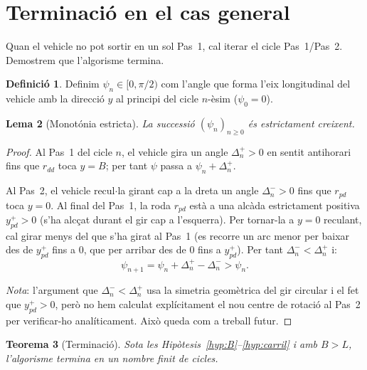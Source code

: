 \documentclass[11pt, a4paper]{article}
\theoremstyle{plain}
\newtheorem{theorem}{Teorema}[section]
\newtheorem{lemma}[theorem]{Lema}
\theoremstyle{definition}
\newtheorem{definition}[theorem]{Definici\'o}
\begin{document}
\section{Terminaci\'o en el cas general}\label{sec:terminacio}

Quan el vehicle no pot sortir en un sol Pas~1, cal iterar el cicle
Pas~1/Pas~2. Demostrem que l'algorisme termina.

\begin{definition}\label{def:psi}
Definim $\psi_n\in[0,\pi/2)$ com l'angle que forma l'eix longitudinal del
vehicle amb la direcci\'o $y$ al principi del cicle $n$-\`esim ($\psi_0=0$).
\end{definition}

\begin{lemma}[Monot\'onia estricta]\label{lem:mono}
La successi\'o $(\psi_n)_{n\geq 0}$ \'es estrictament creixent.
\end{lemma}

\begin{proof}
Al Pas~1 del cicle $n$, el vehicle gira un angle $\Delta_n^+>0$ en sentit
antihorari fins que $r_{dd}$ toca $y=B$; per tant $\psi$ passa a
$\psi_n+\Delta_n^+$.

Al Pas~2, el vehicle recul$\cdot$la girant cap a la dreta un angle
$\Delta_n^->0$ fins que $r_{pd}$ toca $y=0$. Al final del Pas~1, la roda
$r_{pd}$ est\`a a una alc\`ada estrictament positiva $y_{pd}^+>0$ (s'ha
alc\c{c}at durant el gir cap a l'esquerra). Per tornar-la a $y=0$ reculant,
cal girar menys del que s'ha girat al Pas~1 (es recorre un arc menor per
baixar des de $y_{pd}^+$ fins a $0$, que per arribar des de $0$ fins a
$y_{pd}^+$). Per tant $\Delta_n^-<\Delta_n^+$ i:
\[
  \psi_{n+1} = \psi_n+\Delta_n^+-\Delta_n^- > \psi_n.
\]

\textit{Nota}: l'argument que $\Delta_n^-<\Delta_n^+$ usa la simetria
geom\`etrica del gir circular i el fet que $y_{pd}^+>0$, per\`o no hem
calculat expl\'icitament el nou centre de rotaci\'o al Pas~2 per verificar-ho
anal\'iticament. Aix\`o queda com a treball futur.
\end{proof}

\begin{theorem}[Terminaci\'o]\label{thm:terminacio}
Sota les Hip\`otesis~\ref{hyp:B}--\ref{hyp:carril} i amb $B>L$, l'algorisme
termina en un nombre finit de cicles.
\end{theorem}
\end{document}
